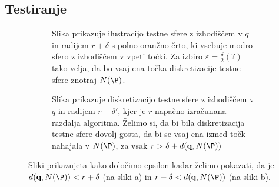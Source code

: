 \subsection{Testiranje}


\begin{figure}[ht]
    \begin{subfigure}{0.49\textwidth}
      \centering
      
      \caption{Slika prikazuje ilustracijo testne sfere z izhodiščem v $q$ in radijem $r+\delta$ s polno oranžno črto, ki vsebuje modro sfero z izhodiščem v vpeti točki. Za izbiro $\varepsilon = \frac{\delta}{2} (?)$ tako velja, da bo vsaj ena točka diskretizacije testne sfere znotraj $N(\P)$.}
      \label{fig:determining-epsilon1}
    \end{subfigure}
    \hfill
    \begin{subfigure}{0.49\textwidth}
      \centering
      
      \caption{Slika prikazuje diskretizacijo testne sfere z izhodiščem v $q$ in radijem $r-\delta'$, kjer je $r$ napačno izračunana razdalja algoritma. Želimo si, da bi bila diskretizacija testne sfere dovolj gosta, da bi se vsaj ena izmed točk nahajala v $N(\P)$, za vsak $r > \delta + d(\textbf{q}, N(\P))$}
      \label{fig:determining-epsilon3}
    \end{subfigure}
    \caption{Sliki prikazujeta kako določimo epsilon kadar želimo pokazati, da je $d(\textbf{q}, N(\P)) < r + \delta$ (na sliki a) in $r - \delta < d(\textbf{q}, N(\P))$ (na sliki b).}
    \label{fig:determining-epsilon}
\end{figure}




